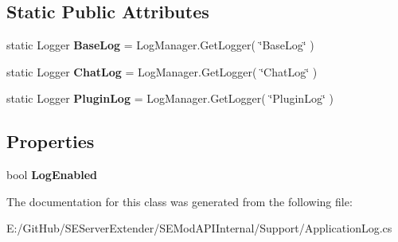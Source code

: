 \subsection*{Static Public Attributes}
\begin{DoxyCompactItemize}
\item 
\hypertarget{class_s_e_mod_a_p_i_internal_1_1_support_1_1_application_log_a21b5460bce4591c35b10d97129138729}{}static Logger {\bfseries Base\+Log} = Log\+Manager.\+Get\+Logger( \char`\"{}Base\+Log\char`\"{} )\label{class_s_e_mod_a_p_i_internal_1_1_support_1_1_application_log_a21b5460bce4591c35b10d97129138729}

\item 
\hypertarget{class_s_e_mod_a_p_i_internal_1_1_support_1_1_application_log_ad793ab363b98c352fd03976394de0f1a}{}static Logger {\bfseries Chat\+Log} = Log\+Manager.\+Get\+Logger( \char`\"{}Chat\+Log\char`\"{} )\label{class_s_e_mod_a_p_i_internal_1_1_support_1_1_application_log_ad793ab363b98c352fd03976394de0f1a}

\item 
\hypertarget{class_s_e_mod_a_p_i_internal_1_1_support_1_1_application_log_a322736effa00930b30c5a0b0cde3e185}{}static Logger {\bfseries Plugin\+Log} = Log\+Manager.\+Get\+Logger( \char`\"{}Plugin\+Log\char`\"{} )\label{class_s_e_mod_a_p_i_internal_1_1_support_1_1_application_log_a322736effa00930b30c5a0b0cde3e185}

\end{DoxyCompactItemize}
\subsection*{Properties}
\begin{DoxyCompactItemize}
\item 
\hypertarget{class_s_e_mod_a_p_i_internal_1_1_support_1_1_application_log_a0dd5c60043f4e93e0a9eea9b56fb56ea}{}bool {\bfseries Log\+Enabled}\label{class_s_e_mod_a_p_i_internal_1_1_support_1_1_application_log_a0dd5c60043f4e93e0a9eea9b56fb56ea}

\end{DoxyCompactItemize}


The documentation for this class was generated from the following file\+:\begin{DoxyCompactItemize}
\item 
E\+:/\+Git\+Hub/\+S\+E\+Server\+Extender/\+S\+E\+Mod\+A\+P\+I\+Internal/\+Support/Application\+Log.\+cs\end{DoxyCompactItemize}
